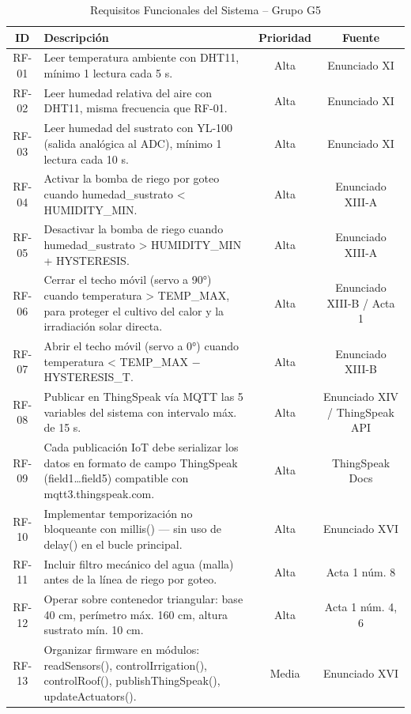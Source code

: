 \begin{table}[tp]
\centering
\renewcommand{\arraystretch}{1.3}
\caption{Requisitos Funcionales del Sistema -- Grupo G5}
\label{tab:rf_proyectofinal}
\begin{tabularx}{\textwidth}{|c|X|c|c|}
\hline
\textbf{ID} & \textbf{Descripción} & \textbf{Prioridad} & \textbf{Fuente} \\
\hline
RF-01 & Leer temperatura ambiente con DHT11, mínimo 1 lectura cada 5 s. & Alta & Enunciado XI \\
\hline
RF-02 & Leer humedad relativa del aire con DHT11, misma frecuencia que RF-01. & Alta & Enunciado XI \\
\hline
RF-03 & Leer humedad del sustrato con YL-100 (salida analógica al ADC), mínimo 1 lectura cada 10 s. & Alta & Enunciado XI \\
\hline
RF-04 & Activar la bomba de riego por goteo cuando humedad\_sustrato < HUMIDITY\_MIN. & Alta & Enunciado XIII-A \\
\hline
RF-05 & Desactivar la bomba de riego cuando humedad\_sustrato > HUMIDITY\_MIN + HYSTERESIS. & Alta & Enunciado XIII-A \\
\hline
RF-06 & Cerrar el techo móvil (servo a 90°) cuando temperatura > TEMP\_MAX, para proteger el cultivo del calor y la irradiación solar directa. & Alta & Enunciado XIII-B / Acta 1 \\
\hline
RF-07 & Abrir el techo móvil (servo a 0°) cuando temperatura < TEMP\_MAX $-$ HYSTERESIS\_T. & Alta & Enunciado XIII-B \\
\hline
RF-08 & Publicar en ThingSpeak vía MQTT las 5 variables del sistema con intervalo máx. de 15 s. & Alta & Enunciado XIV / ThingSpeak API \\
\hline
RF-09 & Cada publicación IoT debe serializar los datos en formato de campo ThingSpeak (field1\ldots field5) compatible con mqtt3.thingspeak.com. & Alta & ThingSpeak Docs \\
\hline
RF-10 & Implementar temporización no bloqueante con millis() --- sin uso de delay() en el bucle principal. & Alta & Enunciado XVI \\
\hline
RF-11 & Incluir filtro mecánico del agua (malla) antes de la línea de riego por goteo. & Alta & Acta 1 núm. 8 \\
\hline
RF-12 & Operar sobre contenedor triangular: base 40 cm, perímetro máx. 160 cm, altura sustrato mín. 10 cm. & Alta & Acta 1 núm. 4, 6 \\
\hline
RF-13 & Organizar firmware en módulos: readSensors(), controlIrrigation(), controlRoof(), publishThingSpeak(), updateActuators(). & Media & Enunciado XVI \\
\hline
\end{tabularx}
\end{table}